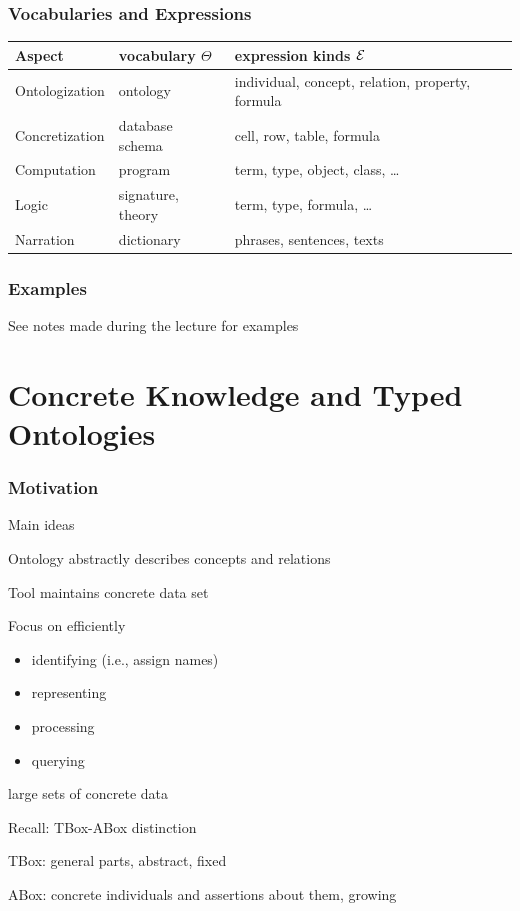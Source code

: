 \begin{frame}\frametitle{Vocabularies and Expressions}
\begin{center}
\footnotesize
\begin{tabular}{l|ll}
Aspect & vocabulary $\Theta$ & expression kinds $\mathcal{E}$ \\
\hline
Ontologization  & ontology & individual, concept, relation, property, formula \\
Concretization & database schema & cell, row, table, formula \\
Computation & program & term, type, object, class, \ldots \\
Logic & signature, theory & term, type, formula, \ldots \\
Narration & dictionary & phrases, sentences, texts \\
\end{tabular}
\end{center}
\end{frame}

\begin{frame}\frametitle{Examples}
See notes made during the lecture for examples
\end{frame}

\section{Concrete Knowledge and Typed Ontologies}

\begin{frame}\frametitle{Motivation}
\begin{blockitems}{Main ideas}
\item Ontology abstractly describes concepts and relations
\item Tool maintains concrete data set
\item Focus on efficiently
  \begin{itemize}
  \item identifying (i.e., assign names)
  \item representing
  \item processing
  \item querying
  \end{itemize}
  large sets of concrete data
\end{blockitems}

\begin{blockitems}{Recall: TBox-ABox distinction}
  \item TBox: general parts, abstract, fixed
  \item ABox: concrete individuals and assertions about them, growing
\end{blockitems}
\end{frame}

